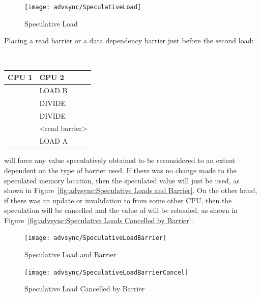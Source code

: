 \begin{figure}[htb]
\begin{center}
\texttt{[image: advsync/SpeculativeLoad]}
\end{center}
\caption{Speculative Load}
\end{figure}

Placing a read barrier or a data dependency barrier just before the second
load:

\vspace{5pt}
\begin{minipage}[t]{\columnwidth}
\tt
\scriptsize
\begin{tabular}{l|p{1.5in}}
	CPU 1 &		CPU 2 \\
	\hline
		&	LOAD B \\
		&	DIVIDE \\
		&	DIVIDE \\
		&	<read barrier> \\
		&	LOAD A \\
\end{tabular}
\end{minipage}
\vspace{5pt}

will force any value speculatively obtained to be reconsidered to an extent
dependent on the type of barrier used.  If there was no change made to the
speculated memory location, then the speculated value will just be used,
as shown in
Figure~\ref{fig:advsync:Speculative Loads and Barrier}.
On the other hand, if there was an update or invalidation to 
from some other CPU, then the speculation will be cancelled and the
value of  will be reloaded,
as shown in Figure~\ref{fig:advsync:Speculative Loads Cancelled by Barrier}.

\begin{figure}[htb]
\begin{center}
\texttt{[image: advsync/SpeculativeLoadBarrier]}
\end{center}
\caption{Speculative Load and Barrier}
\end{figure}

\begin{figure}[htb]
\begin{center}
\texttt{[image: advsync/SpeculativeLoadBarrierCancel]}
\end{center}
\caption{Speculative Load Cancelled by Barrier}
\end{figure}

